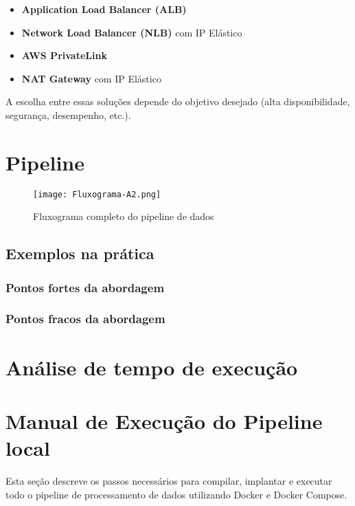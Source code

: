 \documentclass[a4paper,12pt]{article}
\begin{document}
\begin{itemize}
    \item \textbf{Application Load Balancer (ALB)}
    \item \textbf{Network Load Balancer (NLB)} com IP Elástico
    \item \textbf{AWS PrivateLink}
    \item \textbf{NAT Gateway} com IP Elástico
\end{itemize}

A escolha entre essas soluções depende do objetivo desejado (alta disponibilidade, segurança, desempenho, etc.).


\section{Pipeline}

\begin{figure}[H]
    \centering
    \texttt{[image: Fluxograma-A2.png]}
    \caption{Fluxograma completo do pipeline de dados}
    \label{fig:pipeline}
\end{figure}

\subsection*{Exemplos na prática}

\subsubsection*{Pontos fortes da abordagem}

\subsubsection*{Pontos fracos da abordagem}




\section{Análise de tempo de execução}



\section{Manual de Execução do Pipeline local}

Esta seção descreve os passos necessários para compilar, implantar e executar todo o pipeline de processamento de dados utilizando Docker e Docker Compose.
\end{document}
